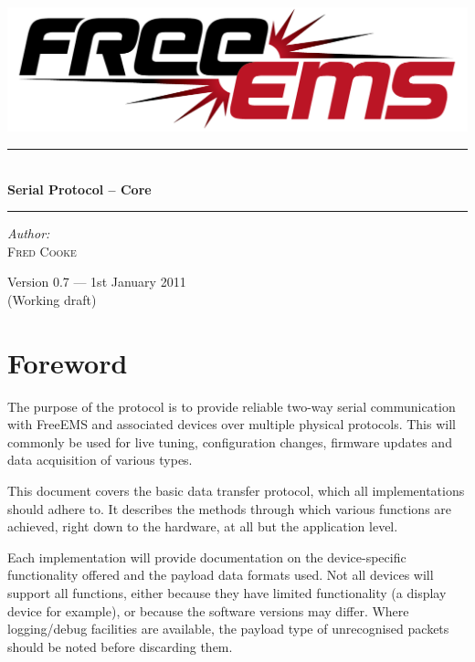 \documentclass[12pt,a4paper,titlepage]{article}
\newcommand{\HRule}{\rule{\linewidth}{0.5mm}}
\begin{document}
\begin{titlepage} 
\begin{center}

\includegraphics[width=1\textwidth]{./logos/freeems}\\[1cm] \vfill

\HRule \\[0.8cm]
{ \huge \bfseries Serial Protocol -- Core}\\[0.4cm]
\HRule \vfill

\Large \emph{Author:}\\
\textsc{Fred Cooke} \vfill

{\large Version 0.7 --- 1st January 2011\\
(Working draft)}

\end{center}
\end{titlepage} 


\tableofcontents
\thispagestyle{empty}
\pagebreak

\section {Foreword}

The purpose of the protocol is to provide reliable two-way serial communication
with FreeEMS and associated devices over multiple physical protocols. This will
commonly be used for live tuning, configuration changes, firmware updates and
data acquisition of various types.

This document covers the basic data transfer protocol, which all
implementations should adhere to. It describes the methods through which
various functions are achieved, right down to the hardware, at all but the
application level.

Each implementation will provide documentation on the device-specific
functionality offered and the payload data formats used. Not all devices
will support all functions, either because they have limited functionality
(a display device for example), or because the software versions may differ.
Where logging/debug facilities are available, the payload type of unrecognised
packets should be noted before discarding them.
\end{document}
